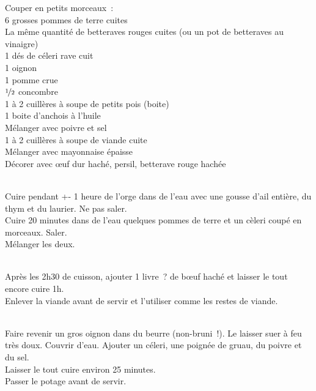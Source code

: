 \begin{minipage}[c]{\textwidth}
Couper en petits morceaux : \\
6 grosses pommes de terre cuites\\
La même quantité de betteraves rouges cuites (ou un pot de betteraves au vinaigre)\\
1 dés de céleri rave cuit\\
1 oignon\\
1 pomme crue\\
$\nicefrac{1}{2}$ concombre\\
1 à 2 cuillères à soupe de petits pois (boite)\\
1 boite d’anchois à l’huile\\
Mélanger avec poivre et sel\\
1 à 2 cuillères à soupe de viande cuite\\
Mélanger avec mayonnaise épaisse\\
Décorer avec œuf dur haché, persil, betterave rouge hachée\\
\\

\end{minipage}

\begin{minipage}[c]{\textwidth}
Cuire pendant +- 1 heure de l'orge dans de l'eau avec une gousse d'ail entière, du thym et du laurier. Ne pas saler.\\
Cuire 20 minutes dans de l'eau quelques pommes de terre et un cèleri coupé en morceaux. Saler.\\
Mélanger les deux.\\
\\

\end{minipage}

\begin{minipage}[c]{\textwidth}
Après les 2h30 de cuisson, ajouter 1 livre ? de bœuf haché et laisser le tout encore cuire 1h.\\
Enlever la viande avant de servir et l’utiliser comme les restes de viande.\\
\\

\end{minipage}

\begin{minipage}[c]{\textwidth}
Faire revenir un gros oignon dans du beurre (non-bruni !). Le laisser suer à feu très doux. Couvrir d’eau. Ajouter un céleri, une poignée de gruau, du poivre et du sel.\\
Laisser le tout cuire environ 25 minutes. \\
Passer le potage avant de servir.\\
\\

\end{minipage}

